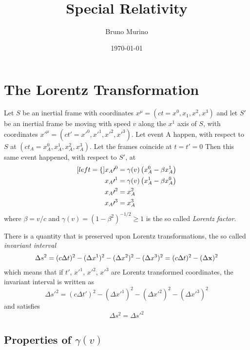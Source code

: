 \documentclass[oneside, 10pt, notitlepage]{book}
\title{Special Relativity} %
\author{Bruno Murino} %
\date{\today} %
\begin{document}
\frontmatter

\notestp
\dominitoc
\tableofcontents

\mainmatter

\chapter{The Lorentz Transformation}

Let \(S\) be an inertial frame with coordinates \(x^{\mu}=(ct=x^0,x_1,x^2,x^3)\) and let \(S{\prime}\) be an inertial frame be moving with speed \(v\) along the \(x^1\) axis of \(S\), with coordinates \(x{\prime}^{\mu} = (ct{\prime}=x{\prime}^0, x{\prime}^1,x{\prime}^2,x{\prime}^3)\). Let event A happen, with respect to \(S\) at \((ct_A = x_A^0,x_A^1,x_A^2,x_A^3)\). Let the frames coincide at \(t=t{\prime}=0\) Then this same event happened, with respect to \(S{\prime}\), at
\begin{subequations}
    \begin{align}[left = \empheqlbrace\,]
    & x_A{\prime}^0 = \gamma(v)\lr{x_A^0 - \beta x_A^1} \\
	& x_A{\prime}^1 = \gamma(v)\lr{x_A^1 - \beta x_A^0} \\
	& x_A{\prime}^2 = x_A^2 \\
	& x_A{\prime}^3 = x_A^3
    \end{align}
\end{subequations}
where \(\beta = v/c\) and \(\gamma(v) = (1-\beta^2)^{-1/2} \geq 1\) is the so called \emph{Lorentz factor}.  

There is a quantity that is preserved upon Lorentz transformations, the so called \emph{invariant interval}
\begin{equation}
    \Delta s^2 = (c\Delta t)^2 - (\Delta x^1)^2 - (\Delta x^2)^2 - (\Delta x^3)^2 = (c\Delta t)^2 - (\Delta \vb{x})^2
\end{equation}
which means that if \(t{\prime}\), \(x{\prime}^1\), \(x{\prime}^2\), \(x{\prime}^3\) are Lorentz transformed coordinates, the invariant interval is written as
\begin{equation}
    \Delta s{\prime}^2 = (c\Delta t{\prime})^2 - (\Delta x{\prime}^1)^2 - (\Delta x{\prime}^2)^2 - (\Delta x{\prime}^3)^2
\end{equation}
and satisfies
\begin{equation}
    \Delta s^2 = \Delta s{\prime}^2
\end{equation}
  

\section{Properties of \texorpdfstring{$\gamma(v)$}{gamma of v}}
\end{document}
